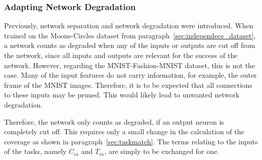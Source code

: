 \subsubsection{Adapting Network Degradation}
Previously, network separation and network degradation were introduced.
When trained on the Moons-Circles dataset from paragraph~\ref{sec:independece_dataset}, a network counts as degraded when any of the inputs or outputs are cut off from the network, since all inputs and outputs are relevant for the success of the network.
However, regarding the MNIST-Fashion-MNIST dataset, this is not the case.
Many of the input features do not carry information, for example, the outer frame of the MNIST images.
Therefore, it is to be expected that all connections to these inputs may be pruned.
This would likely lead to unwanted network degradation.

Therefore, the network only counts as degraded, if an output neuron is completely cut off.
This requires only a small change in the calculation of the coverage as shown in paragraph~\ref{sec:taskmatch}.
The terms relating to the inputs of the tasks, namely $C_{in}$ and $T_{in}$, are simply to be exchanged for one.